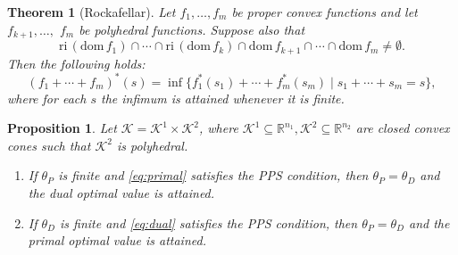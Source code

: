 \documentclass{article}
\newcommand{\reInt}{\mathrm{ri}\,}
\newcommand{\stdCone}{ {\mathcal{K}}}
\newcommand{\pOpt}{ {\theta _P}}
\newcommand{\dOpt}{ {\theta _D}}
\renewcommand{\Re}{\mathbb{R}}
\newcommand{\fDom}{\mathrm{ dom } \,}
\newtheorem{proposition}[definition]{Proposition}
\newtheorem{theorem}[definition]{Theorem}
\begin{document}
\begin{theorem}[Rockafellar]\label{theo:conv}
Let $f_1, \ldots, f_m$ be proper convex functions and let $f_{k+1}, \ldots ,$ $f_m$ be 
polyhedral functions. Suppose also that
$$
\reInt (\fDom f_1) \cap \cdots \cap \reInt (\fDom f_k) \cap \fDom f_{k+1} \cap \cdots \cap \fDom f_m \neq \emptyset.
$$
Then the following holds:
\begin{equation*}
(f_1 + \cdots + f_m)^*(s) = \inf \{ f_1^*(s_1) + \cdots + f_m^*(s_m) \mid s_1 + \cdots + s_m = s \},
\end{equation*}
where for each $s$ the infimum is attained whenever it is finite.
\end{theorem}

\begin{proposition}
Let $\stdCone = \stdCone ^1\times \stdCone ^2$, where  $\stdCone ^1\subseteq \Re^{n_1},\stdCone ^2 \subseteq \Re^{n_2}$ are closed convex cones such that $\stdCone ^2$ is polyhedral.
\begin{enumerate}[label=({\it\roman*})]
\item If $\pOpt$ is finite and \eqref{eq:primal} satisfies the PPS condition, then $\pOpt = \dOpt$ and the dual optimal value is attained.
\item If $\dOpt$ is finite and \eqref{eq:dual} satisfies the PPS condition, then $\pOpt = \dOpt$ and the primal 
optimal value is attained.
\end{enumerate}
\end{proposition}
\end{document}
